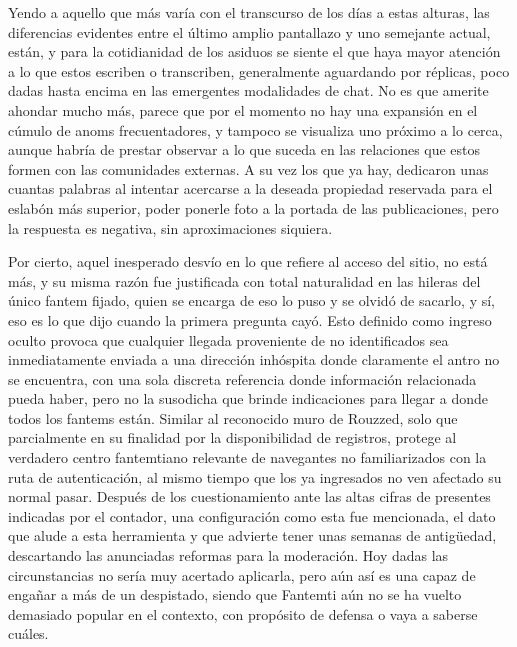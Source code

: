 \documentclass[
]{book}
\begin{document}
Yendo a aquello que más varía con el transcurso de los días a estas alturas, las diferencias evidentes entre el último amplio pantallazo y uno semejante actual, están, y para la cotidianidad de los asiduos se siente el que haya mayor atención a lo que estos escriben o transcriben, generalmente aguardando por réplicas, poco dadas hasta encima en las emergentes modalidades de chat. No es que amerite ahondar mucho más, parece que por el momento no hay una expansión en el cúmulo de anoms frecuentadores, y tampoco se visualiza uno próximo a lo cerca, aunque habría de prestar observar a lo que suceda en las relaciones que estos formen con las comunidades externas. A su vez los que ya hay, dedicaron unas cuantas palabras al intentar acercarse a la deseada propiedad reservada para el eslabón más superior, poder ponerle foto a la portada de las publicaciones, pero la respuesta es negativa, sin aproximaciones siquiera.

Por cierto, aquel inesperado desvío en lo que refiere al acceso del sitio, no está más, y su misma razón fue justificada con total naturalidad en las hileras del único fantem fijado, quien se encarga de eso lo puso y se olvidó de sacarlo, y sí, eso es lo que dijo cuando la primera pregunta cayó. Esto definido como ingreso oculto provoca que cualquier llegada proveniente de no identificados sea inmediatamente enviada a una dirección inhóspita donde claramente el antro no se encuentra, con una sola discreta referencia donde información relacionada pueda haber, pero no la susodicha que brinde indicaciones para llegar a donde todos los fantems están. Similar al reconocido muro de Rouzzed, solo que parcialmente en su finalidad por la disponibilidad de registros, protege al verdadero centro fantemtiano relevante de navegantes no familiarizados con la ruta de autenticación, al mismo tiempo que los ya ingresados no ven afectado su normal pasar. Después de los cuestionamiento ante las altas cifras de presentes indicadas por el contador, una configuración como esta fue mencionada, el dato que alude a esta herramienta y que advierte tener unas semanas de antigüedad, descartando las anunciadas reformas para la moderación. Hoy dadas las circunstancias no sería muy acertado aplicarla, pero aún así es una capaz de engañar a más de un despistado, siendo que Fantemti aún no se ha vuelto demasiado popular en el contexto, con propósito de defensa o vaya a saberse cuáles.
\end{document}
